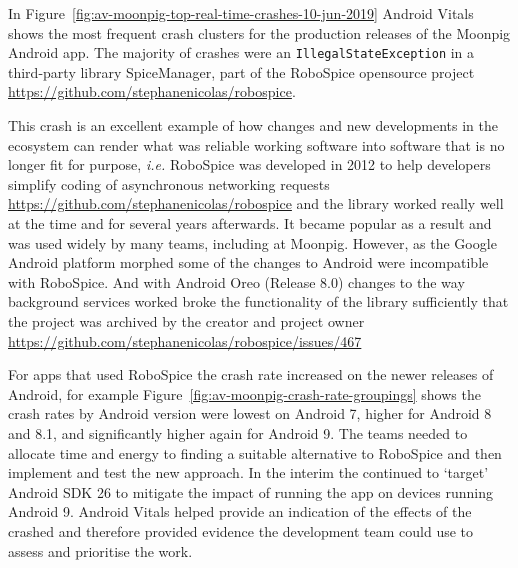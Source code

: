 In Figure~\ref{fig:av-moonpig-top-real-time-crashes-10-jun-2019} Android Vitals shows the most frequent crash clusters for the production releases of the Moonpig Android app. The majority of crashes were an \texttt{IllegalStateException} in a third-party library SpiceManager, part of the RoboSpice opensource project \url{https://github.com/stephanenicolas/robospice}. 

This crash is an excellent example of how changes and new developments in the ecosystem can render what was reliable working software into software that is no longer fit for purpose, \emph{i.e.} RoboSpice was developed in 2012 to help developers simplify coding of asynchronous networking requests \url{https://github.com/stephanenicolas/robospice} and the library worked really well at the time and for several years afterwards. It became popular as a result and was used widely by many teams, including at Moonpig. However, as the Google Android platform morphed some of the changes to Android were incompatible with RoboSpice. And with Android Oreo (Release 8.0) changes to the way background services worked broke the functionality of the library sufficiently that the project was archived by the creator and project owner \url{https://github.com/stephanenicolas/robospice/issues/467} 

For apps that used RoboSpice the crash rate increased on the newer releases of Android, for example Figure~\ref{fig:av-moonpig-crash-rate-groupings} shows the crash rates by Android version were lowest on Android 7, higher for Android 8 and 8.1, and significantly higher again for Android 9. The teams needed to allocate time and energy to finding a suitable alternative to RoboSpice and then implement and test the new approach. In the interim the continued to `target' Android SDK 26 to mitigate the impact of running the app on devices running Android 9. Android Vitals helped provide an indication of the effects of the crashed and therefore provided evidence the development team could use to assess and prioritise the work.

